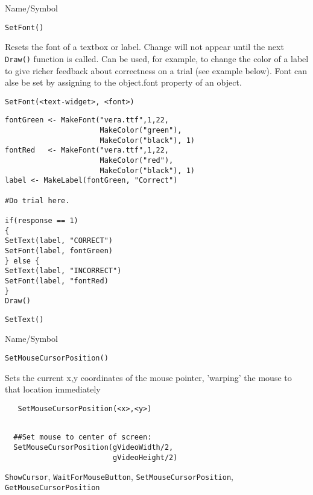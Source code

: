 \begin{desc}{Name/Symbol}
\item[Name/Symbol] 	\verb+SetFont()+

\item[Description] Resets the font of a textbox or label.  Change will
  not appear until the next \verb+Draw()+ function is called.  Can be
  used, for example, to change the color of a label to give richer
  feedback about correctness on a trial (see example below).  Font can
alse be set by assigning to the object.font property of an object.

\item[Usage]
\begin{verbatim}
SetFont(<text-widget>, <font>)
\end{verbatim}

\item[Example]   	
\begin{verbatim}
fontGreen <- MakeFont("vera.ttf",1,22, 
                      MakeColor("green"),
                      MakeColor("black"), 1)
fontRed   <- MakeFont("vera.ttf",1,22,
                      MakeColor("red"),
                      MakeColor("black"), 1)
label <- MakeLabel(fontGreen, "Correct")

#Do trial here.       	

if(response == 1)
{
SetText(label, "CORRECT")
SetFont(label, fontGreen)
} else {
SetText(label, "INCORRECT")
SetFont(label, "fontRed)
}
Draw()
\end{verbatim}

\item[See Also]    	\verb+SetText()+
\end{desc}

\begin{desc}{Name/Symbol}
\item[Name/Symbol]	\verb+SetMouseCursorPosition()+

\item[Description] Sets the current x,y coordinates of the mouse
  pointer, 'warping' the mouse to that location immediately

\item[Usage]
\begin{verbatim}
   SetMouseCursorPosition(<x>,<y>)
\end{verbatim}

\item[Example]	
\begin{verbatim}

  ##Set mouse to center of screen:
  SetMouseCursorPosition(gVideoWidth/2,
                         gVideoHeight/2)
\end{verbatim}


\item[See Also]
  \verb+ShowCursor+, \verb+WaitForMouseButton+,
  \verb+SetMouseCursorPosition+, \verb+GetMouseCursorPosition+
\end{desc}

